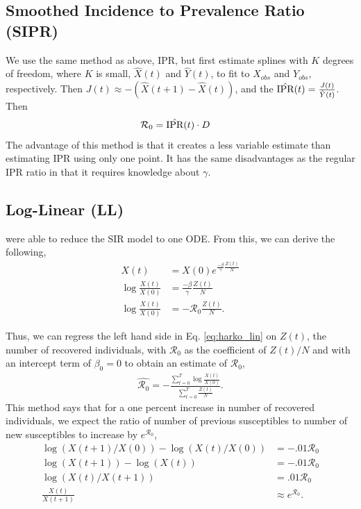 \message{ !name(draft_v13.tex)}\documentclass[12pt]{article}
\newcommand{\rr}{\ensuremath{\mathcal{R}_0}}
\begin{document}
\subsection{Smoothed Incidence to Prevalence Ratio (SIPR)}
We use the same method as above, IPR, but first estimate splines with $K$ degrees of freedom, where $K$ is small, $\hat{X}(t)$ and $\hat{Y}(t)$, to fit to $X_{obs}$ and $Y_{obs}$, respectively.  Then  $J(t) \approx -(\hat{X}(t+1) - \hat{X}(t))$, and the $\hat{\textnormal{IPR}}(t) = \frac{J(t)}{\hat{Y}(t)}$.  Then
\begin{align*}
\rr &= \hat{\textnormal{IPR}}(t) \cdot D
\end{align*}
The advantage of this method is that it creates a less variable estimate than estimating IPR using only one point.  It has the same disadvantages as the regular IPR ratio in that it requires knowledge about $\gamma$.

\subsection{Log-Linear (LL)}
\cite{harko2014exact} were able to reduce the SIR model to one ODE.  From this, we can derive the following,
\begin{align}
  X(t) &=  X(0) e^{\frac{-\beta}{\gamma}\frac{Z(t)}{N}} \nonumber\\
  \log \frac{X(t)}{X(0)} &=  \frac{-\beta }{\gamma}\frac{Z(t)}{N} \nonumber\\
  \log \frac{X(t)}{X(0)} &=  -\rr \frac{Z(t)}{N}. \label{eq:harko_lin}
\end{align}

Thus, we can regress the left hand side in Eq. \ref{eq:harko_lin} on $Z(t)$, the number of recovered individuals, with $\rr$ as the coefficient of $Z(t)/N$ and with an intercept term of $\beta_0=0$ to obtain an estimate of $\rr$,
\begin{align*}
  \hat{\rr} = -\frac{\sum_{t=0}^T \log \frac{ X(t)}{X(0)}}{\sum_{t=0}^T\frac{Z(t)}{N}}.
\end{align*}
This method says that for a one percent increase in number of recovered individuals, we expect the ratio of number of previous susceptibles to number of new susceptibles to increase by $e^{\rr}$,
\begin{align*}
  \log \left ( X(t+1)/ X(0) \right ) - \log \left ( X(t)/X(0) \right ) &= - .01\rr\\
  \log \left ( X(t+1) \right ) - \log \left ( X(t) \right )  &=- .01\rr\\
  \log \left ( X(t) / X(t+1) \right ) &= .01\rr\\
  \frac{X(t)}{X(t+1)}  &\approx e^{\rr}.
\end{align*}
\end{document}
